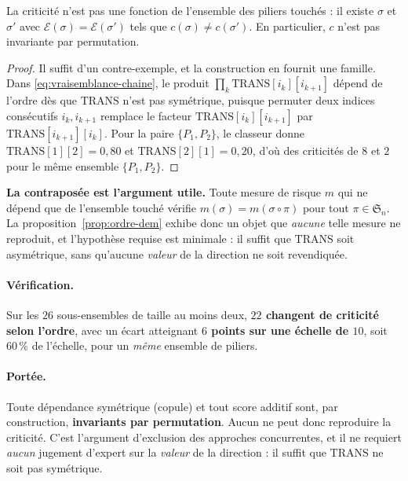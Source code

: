 \begin{proposition}\label{prop:ordre-dem}
La criticité n'est pas une fonction de l'ensemble des piliers touchés : il existe
$\sigma$ et $\sigma'$ avec $\mathcal{E}(\sigma)=\mathcal{E}(\sigma')$ tels que
$c(\sigma)\neq c(\sigma')$. En particulier, $c$ n'est pas invariante par permutation.
\end{proposition}

\begin{proof}
Il suffit d'un contre-exemple, et la construction en fournit une famille. Dans
\eqref{eq:vraisemblance-chaine}, le produit $\prod_k \mathrm{TRANS}[i_k][i_{k+1}]$ dépend de
l'ordre dès que $\mathrm{TRANS}$ n'est pas symétrique, puisque permuter deux indices consécutifs
$i_k, i_{k+1}$ remplace le facteur $\mathrm{TRANS}[i_k][i_{k+1}]$ par
$\mathrm{TRANS}[i_{k+1}][i_k]$. Pour la paire $\{P_1,P_2\}$, le classeur donne
$\mathrm{TRANS}[1][2]=0{,}80$ et $\mathrm{TRANS}[2][1]=0{,}20$, d'où des criticités de $8$ et
$2$ pour le même ensemble $\{P_1,P_2\}$.
\end{proof}

\begin{cle}
\textbf{La contraposée est l'argument utile.} Toute mesure de risque $m$ qui ne dépend que de
l'ensemble touché vérifie $m(\sigma)=m(\sigma\circ\pi)$ pour tout $\pi\in\mathfrak{S}_n$. La
proposition~\ref{prop:ordre-dem} exhibe donc un objet que \emph{aucune} telle mesure ne reproduit,
et l'hypothèse requise est minimale : il suffit que $\mathrm{TRANS}$ soit asymétrique, sans
qu'aucune \emph{valeur} de la direction ne soit revendiquée.
\end{cle}

\paragraph{Vérification.} Sur les $26$ sous-ensembles de taille au moins deux,
\textbf{$22$ changent de criticité selon l'ordre}, avec un écart atteignant \textbf{$6$
points sur une échelle de $10$}, soit $60\,\%$ de l'échelle, pour un \emph{même} ensemble
de piliers.

\paragraph{Portée.} Toute dépendance symétrique (copule) et tout score additif sont, par
construction, \textbf{invariants par permutation}. Aucun ne peut donc reproduire la
criticité. C'est l'argument d'exclusion des approches concurrentes, et il ne requiert
\emph{aucun} jugement d'expert sur la \emph{valeur} de la direction : il suffit que
$\mathrm{TRANS}$ ne soit pas symétrique.

